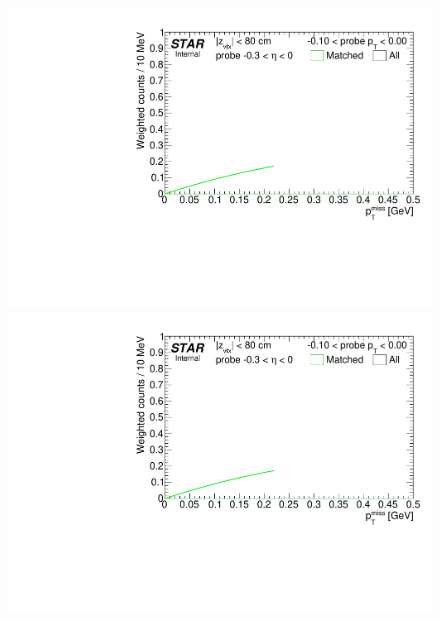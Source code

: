 \begin{figure}[ht]
{}~
\parbox{0.24\textwidth}{
  \centering
  \includegraphics[width=\linewidth,page=8]{graphics/correctionsToEff/TOF_tagAndProbe/Fitting_effVsPt_mc_ETABINS_C.CPT2.pdf}\\
  \includegraphics[width=\linewidth,page=10]{graphics/correctionsToEff/TOF_tagAndProbe/Fitting_effVsPt_mc_ETABINS_C.CPT2.pdf}\\[84pt]

}%
\end{figure}


